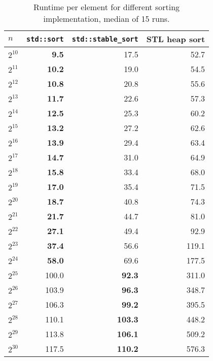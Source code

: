 \documentclass{article}
\begin{document}
\begin{table}\centering
\begin{tabular}{l|rrr}
$n$ & \texttt{std::sort} & \texttt{std::stable\_sort} & STL heap sort \\ \hline
$2^{10}$ &  \bf 9.5 &      17.5 &  52.7 \\
$2^{11}$ & \bf 10.2 &      19.0 &  54.5 \\
$2^{12}$ & \bf 10.8 &      20.8 &  55.6 \\
$2^{13}$ & \bf 11.7 &      22.6 &  57.3 \\
$2^{14}$ & \bf 12.5 &      25.3 &  60.2 \\
$2^{15}$ & \bf 13.2 &      27.2 &  62.6 \\
$2^{16}$ & \bf 13.9 &      29.4 &  63.4 \\
$2^{17}$ & \bf 14.7 &      31.0 &  64.9 \\
$2^{18}$ & \bf 15.8 &      33.4 &  68.0 \\
$2^{19}$ & \bf 17.0 &      35.4 &  71.5 \\
$2^{20}$ & \bf 18.7 &      40.8 &  74.3 \\
$2^{21}$ & \bf 21.7 &      44.7 &  81.0 \\
$2^{22}$ & \bf 27.1 &      49.4 &  92.9 \\
$2^{23}$ & \bf 37.4 &      56.6 & 119.1 \\
$2^{24}$ & \bf 58.0 &      69.6 & 177.5 \\
$2^{25}$ &    100.0 &  \bf 92.3 & 311.0 \\
$2^{26}$ &    103.9 &  \bf 96.3 & 348.7 \\
$2^{27}$ &    106.3 &  \bf 99.2 & 395.5 \\
$2^{28}$ &    110.1 & \bf 103.3 & 448.2 \\
$2^{29}$ &    113.8 & \bf 106.1 & 509.2 \\
$2^{30}$ &    117.5 & \bf 110.2 & 576.3 \\
\end{tabular}
\caption{Runtime per element for different sorting implementation, median of 15 runs.}
\end{table}
\end{document}
